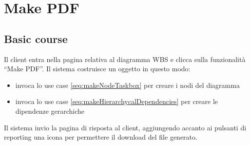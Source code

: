 \section{Make PDF}
\label{seq:WBSMakePDF}

\subsection{Basic course}
Il client entra nella pagina relativa al diagramma WBS e clicca sulla 
funzionalit\`a “Make PDF”. Il sistema costruisce un oggetto in questo modo:
\begin{itemize}
  \item invoca lo use case \ref{seq:makeNodeTaskbox} per creare i nodi del 
  diagramma
  \item invoca lo use case \ref{seq:makeHierarchycalDependencies} per creare le
  dipendenze gerarchiche
\end{itemize}
Il sistema invio la pagina di risposta al client, aggiungendo accanto ai
pulsanti di reporting una icona per permettere il download del file generato.
